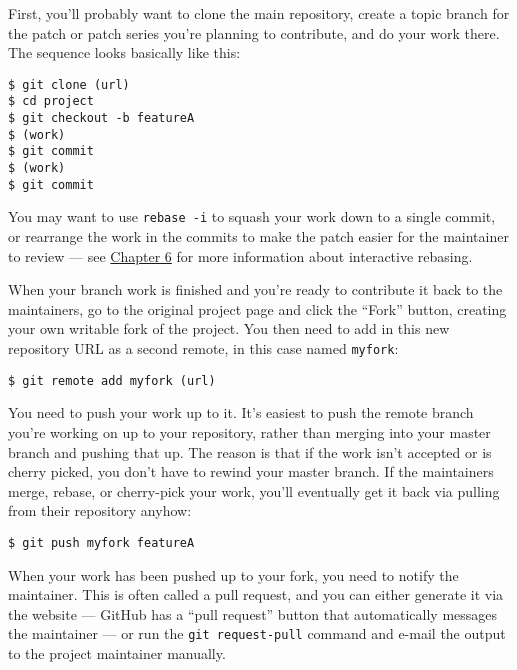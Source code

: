 \documentclass[a4paper]{book}
\newcounter{tab}[chapter]
\newcommand{\prechap}{Chapter }
\newcommand{\postchap}{}
\newcommand{\chapref}[1]{\hyperref[chap:#1]{\prechap #1\postchap}}
\begin{document}
First, you'll probably want to clone the main repository, create a topic branch for the patch or patch series you're planning to contribute, and do your work there. The sequence looks basically like this:

\begin{shaded}\begin{verbatim}
$ git clone (url)
$ cd project
$ git checkout -b featureA
$ (work)
$ git commit
$ (work)
$ git commit
\end{verbatim}\end{shaded}

You may want to use \texttt{rebase -i} to squash your work down to a single commit, or rearrange the work in the commits to make the patch easier for the maintainer to review --- see \chapref{6} for more information about interactive rebasing.

When your branch work is finished and you're ready to contribute it back to the maintainers, go to the original project page and click the “Fork” button, creating your own writable fork of the project. You then need to add in this new repository URL as a second remote, in this case named \texttt{myfork}:

\begin{shaded}\begin{verbatim}
$ git remote add myfork (url)
\end{verbatim}\end{shaded}

You need to push your work up to it. It's easiest to push the remote branch you're working on up to your repository, rather than merging into your master branch and pushing that up. The reason is that if the work isn't accepted or is cherry picked, you don't have to rewind your master branch. If the maintainers merge, rebase, or cherry-pick your work, you'll eventually get it back via pulling from their repository anyhow:

\begin{shaded}\begin{verbatim}
$ git push myfork featureA
\end{verbatim}\end{shaded}

When your work has been pushed up to your fork, you need to notify the maintainer. This is often called a pull request, and you can either generate it via the website --- GitHub has a “pull request” button that automatically messages the maintainer --- or run the \texttt{git request-pull} command and e-mail the output to the project maintainer manually.
\end{document}
